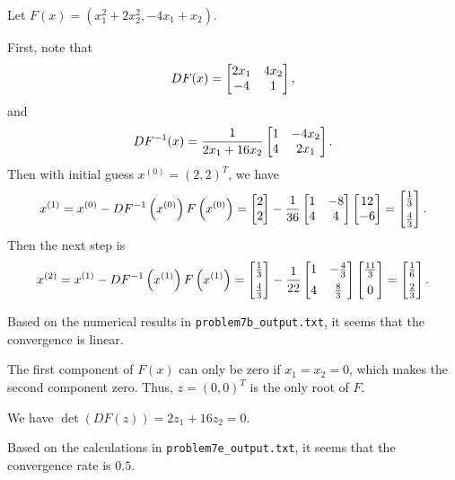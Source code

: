 \documentclass[newpage]{homework}
\begin{document}
\question
Let $F(x) = (x_1^2+2x_2^2, -4x_1 +x_2)$.
\begin{alphaparts}
	\questionpart First, note that
	\begin{equation*}
		DF(x) = \left[\begin{matrix}2x_1 & 4x_2 \\ -4 & 1\end{matrix}\right],
	\end{equation*}
	and
	\begin{equation*}
		DF^{-1}(x) = \frac{1}{2x_1 + 16x_2}\left[\begin{matrix}1 & -4x_2 \\ 4 & 2x_1\end{matrix}\right].
	\end{equation*}
	Then with initial guess $x^{(0)} = (2,2)^T$, we have
	\begin{equation*}
		x^{(1)} = x^{(0)} - DF^{-1}\left(x^{(0)}\right)F\left(x^{(0)}\right) = \left[\begin{matrix}2\\2\end{matrix}\right] - \frac{1}{36}\left[\begin{matrix}1 & -8 \\ 4 & 4\end{matrix}\right]\left[\begin{matrix}12 \\ -6\end{matrix}\right] = \left[\begin{matrix}\frac{1}{3} \\[0.5em] \frac{4}{3}\end{matrix}\right].
	\end{equation*}
	Then the next step is
	\begin{equation*}
		x^{(2)} = x^{(1)} - DF^{-1}\left(x^{(1)}\right)F\left(x^{(1)}\right) = \left[\begin{matrix}\frac{1}{3} \\[0.5em] \frac{4}{3}\end{matrix}\right] - \frac{1}{22}\left[\begin{matrix}1 & -\frac{4}{3} \\[0.5em] 4 & \frac{8}{3}\end{matrix}\right]\left[\begin{matrix}\frac{11}{3} \\[0.5em] 0\end{matrix}\right] = \left[\begin{matrix}\frac{1}{6} \\[0.5em] \frac{2}{3}\end{matrix}\right].
	\end{equation*}
	
	\questionpart Based on the numerical results in \texttt{problem7b\_output.txt}, it seems that the convergence is linear.
	
	\questionpart The first component of $F(x)$ can only be zero if $x_1= x_2=0$, which makes the second component zero. Thus, $z = (0,0)^T$ is the only root of $F$.
	
	\questionpart We have $\det(DF(z)) = 2z_1 + 16z_2 = 0$.
	
	\questionpart Based on the calculations in \texttt{problem7e\_output.txt}, it seems that the convergence rate is $0.5$.
\end{alphaparts}
\end{document}
